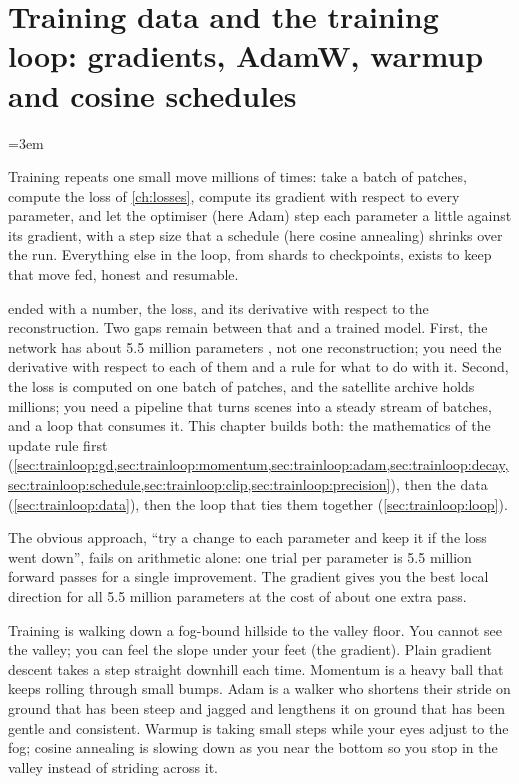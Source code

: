 \chapter{Training data and the training loop: gradients, AdamW, warmup and cosine schedules}\label{ch:trainloop}
\begingroup\emergencystretch=3em %

\begin{onething}
Training repeats one small move millions of times: take a batch of patches, compute the loss
of \cref{ch:losses}, compute its gradient with respect to every parameter, and let the
optimiser (here Adam) step each parameter a little against its gradient, with a step size
that a schedule (here cosine annealing) shrinks over the run. Everything else in the loop,
from shards to checkpoints, exists to keep that move fed, honest and resumable.
\end{onething}

 ended with a number, the loss, and its derivative with respect to the
reconstruction. Two gaps remain between that and a trained model. First, the network has about
5.5 million parameters , not
one reconstruction; you need the derivative with respect to each of them and a rule for what
to do with it. Second, the loss is computed on one batch of patches, and the satellite archive
holds millions; you need a pipeline that turns scenes into a steady stream of batches, and a
loop that consumes it. This chapter builds both: the mathematics of the update rule first
(\cref{sec:trainloop:gd,sec:trainloop:momentum,sec:trainloop:adam,sec:trainloop:decay,sec:trainloop:schedule,sec:trainloop:clip,sec:trainloop:precision}),
then the data (\cref{sec:trainloop:data}), then the loop that ties them together
(\cref{sec:trainloop:loop}).

The obvious approach, ``try a change to each parameter and keep it if the loss went down'',
fails on arithmetic alone: one trial per parameter is 5.5 million forward passes for a single
improvement. The gradient gives you the best local direction for all 5.5 million parameters at
the cost of about one extra pass.

\begin{analogy}
Training is walking down a fog-bound hillside to the valley floor. You cannot see the valley;
you can feel the slope under your feet (the gradient). Plain gradient descent takes a step
straight downhill each time. Momentum is a heavy ball that keeps rolling through small bumps.
Adam is a walker who shortens their stride on ground that has been steep and jagged and
lengthens it on ground that has been gentle and consistent. Warmup is taking small steps while
your eyes adjust to the fog; cosine annealing is slowing down as you near the bottom so you
stop in the valley instead of striding across it.
\end{analogy}

